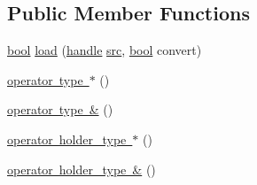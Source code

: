 \subsection*{Public Member Functions}
\begin{DoxyCompactItemize}
\item 
\mbox{\hyperlink{asdl_8h_af6a258d8f3ee5206d682d799316314b1}{bool}} \mbox{\hyperlink{structcopyable__holder__caster_ad6d2e3b89e1fab57e5a93e15171c0c3a}{load}} (\mbox{\hyperlink{classhandle}{handle}} \mbox{\hyperlink{_s_d_l__opengl__glext_8h_a72e0fdf0f845ded60b1fada9e9195cd7}{src}}, \mbox{\hyperlink{asdl_8h_af6a258d8f3ee5206d682d799316314b1}{bool}} convert)
\item 
\mbox{\hyperlink{structcopyable__holder__caster_a9b3a08950760728cf856a82824b4ddfd}{operator type $\ast$}} ()
\item 
\mbox{\hyperlink{structcopyable__holder__caster_a80d72d78e526acacc5fc38c63fdc4f69}{operator type \&}} ()
\item 
\mbox{\hyperlink{structcopyable__holder__caster_a303261c970995da9e0e5b08614bd3034}{operator holder\+\_\+type $\ast$}} ()
\item 
\mbox{\hyperlink{structcopyable__holder__caster_a1efff1069bd3b73e34bcb6d788820dc4}{operator holder\+\_\+type \&}} ()
\end{DoxyCompactItemize}
